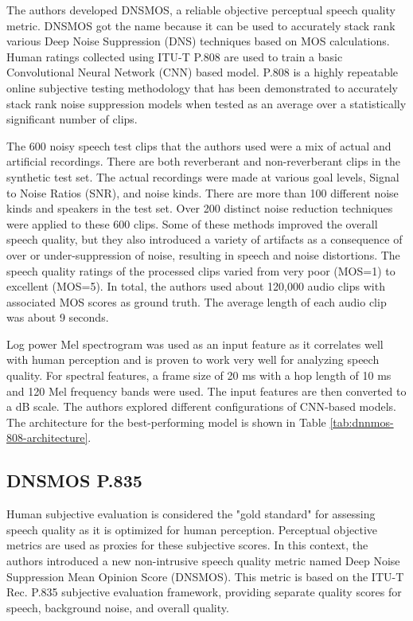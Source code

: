 The authors developed DNSMOS, a reliable objective perceptual speech quality metric. DNSMOS got the name because it can be used to accurately stack rank various Deep Noise Suppression (DNS) techniques based on MOS calculations. Human ratings collected using ITU-T P.808 are used to train a basic Convolutional Neural Network (CNN) based model. P.808 is a highly repeatable online subjective testing methodology that has been demonstrated to accurately stack rank noise suppression models when tested as an average over a statistically significant number of clips.

The 600 noisy speech test clips that the authors used were a mix of actual and artificial recordings. There are both reverberant and non-reverberant clips in the synthetic test set. The actual recordings were made at various goal levels, Signal to Noise Ratios (SNR), and noise kinds. There are more than 100 different noise kinds and speakers in the test set. Over 200 distinct noise reduction techniques were applied to these 600 clips. Some of these methods improved the overall speech quality, but they also introduced a variety of artifacts as a consequence of over or under-suppression of noise, resulting in speech and noise distortions. The speech quality ratings of the processed clips varied from very poor (MOS=1) to excellent (MOS=5). In total, the authors used about 120,000 audio clips with associated MOS scores as ground truth. The average length of each audio clip was about 9 seconds.

Log power Mel spectrogram was used as an input feature as it correlates well with human perception and is proven to work very well for analyzing speech quality. For spectral features, a frame size of 20 ms with a hop length of 10 ms and 120 Mel frequency bands were used. The input features are then converted to a dB scale. The authors explored different configurations of CNN-based models. The architecture for the best-performing model is shown in Table \ref{tab:dnnmos-808-architecture}.

\subsection{DNSMOS P.835 \cite{reddy2022dnsmosp835nonintrusiveperceptual}}
Human subjective evaluation is considered the "gold standard" for assessing speech quality as it is optimized for human perception. Perceptual objective metrics are used as proxies for these subjective scores. In this context, the authors introduced a new non-intrusive speech quality metric named Deep Noise Suppression Mean Opinion Score (DNSMOS). This metric is based on the ITU-T Rec. P.835 subjective evaluation framework, providing separate quality scores for speech, background noise, and overall quality.


